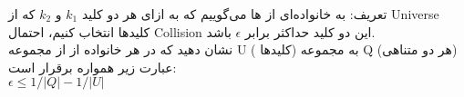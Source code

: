 تعریف: به خانواده‌ای از ها  می‌گوییم که به ازای هر دو کلید $k_1$ و $k_2$ که از Universe کلیدها انتخاب کنیم،
احتمال Collision این دو کلید حداکثر برابر $\epsilon$ باشد.
\\
نشان دهید که در هر خانواده از  از مجموعه U ( کلیدها) به مجموعه Q (هر دو متناهی) عبارت زیر همواره برقرار است:
\\
$\epsilon \leq 1/|Q| - 1/|U|$